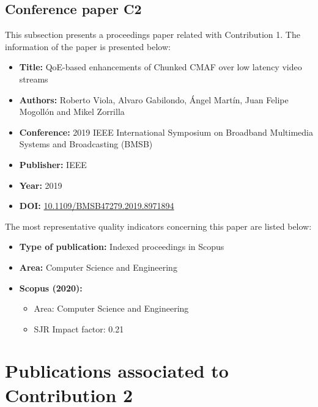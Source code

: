 \subsection{Conference paper C2}
\label{chap:BMSB2019}
This subsection presents a proceedings paper related with Contribution 1.
The information of the paper is presented below:
\begin{itemize} \itemsep1pt\parskip0pt
	\item \textbf{Title:} QoE-based enhancements of Chunked CMAF over low latency video streams
	\item \textbf{Authors:} Roberto Viola, Alvaro Gabilondo, \'Angel Mart\'in, Juan Felipe Mogoll\'on and Mikel Zorrilla
	\item \textbf{Conference:} 2019 IEEE International Symposium on Broadband Multimedia Systems and Broadcasting (BMSB)
	\item \textbf{Publisher:} IEEE
	\item \textbf{Year:} 2019
	\item \textbf{DOI:} \url{10.1109/BMSB47279.2019.8971894}
\end{itemize}
The most representative quality indicators concerning this paper are listed below:
\begin{itemize} \itemsep1pt\parskip0pt
	\item \textbf{Type of publication:} Indexed proceedings in Scopus
	\item \textbf{Area:} Computer Science and Engineering
	\item \textbf{Scopus (2020):}
	\begin{itemize}
		\item Area: Computer Science and Engineering
		\item SJR Impact factor: 0.21
	\end{itemize}
\end{itemize}


\section{Publications associated to Contribution 2}

